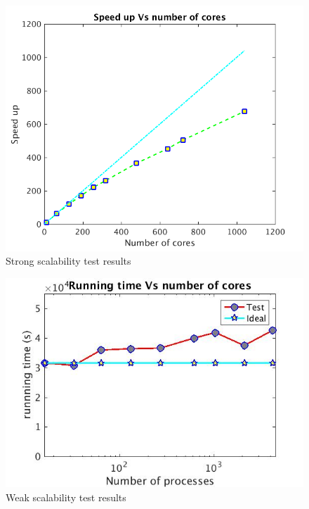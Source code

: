 \documentclass[journal abbreviation, manuscript]{copernicus}
\begin{document}
\begin{figure}[!t]
\centering
\includegraphics[scale=0.35]{strong}
\caption{Strong scalability test results}
\label{fig:strong_scale}
\end{figure}

\begin{figure}[!t]
\centering
\includegraphics[scale=0.35]{weak_scale}
\caption{Weak scalability test results}
\label{fig:weak_scale}
\end{figure}
\end{document}
